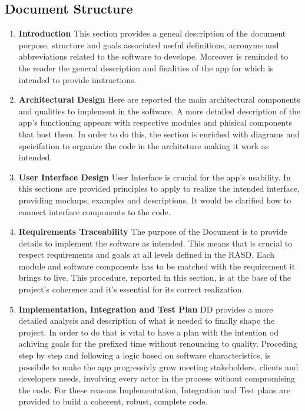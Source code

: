 \subsection{Document Structure}
\begin{enumerate}
    \item \textbf{Introduction} This section provides a geneal description of the document porpose, structure and goals associated useful definitions, acronyms and abbreviations related to the software to develope. Moreover is reminded to the reader the general description and finalities of the app for which is intended to provide instructions.
    \item \textbf{Architectural Design} Here are reported the main architectural components and qualities to implement in the software. A more detailed description of the app's functioning appears with respective modules and phisical components that host them. In order to do this, the section is enriched with diagrams and speicifation to organize the code in the architeture making it work as intended.
    \item \textbf{User Interface Design} User Interface is crucial for the app's usability. In this sections are provided principles to apply to realize the intended interface, providing mockups, examples and descriptions. It would be clarified how to connect interface components to the code.
    \item \textbf{Requirements Traceability} The purpose of the Document is to provide details to implement the software as intended. This means that is crucial to respect requirements and goals at all levels defined in the RASD. Each module and software components has to be matched with the requirement it brings to live. This procedure, reported in this section, is at the base of the project's coherence and it's essential for its  correct realization.
    \item \textbf{Implementation, Integration and Test Plan} DD provides a more detailed analysis and description of what is needed to finally shape the project. In order to do that is vital to have a plan with the intention od achiving goals for the prefixed time without renouncing to quality. Proceding step by step and following a logic based on software characteristics, is possibile to make the app progressivly grow meeting stakeholders, clients and developers needs, involving every actor in the process without compromising the code. For these reasons Implementation, Integration and Test plans are provided to build a coherent, robust, complete code.
\end{enumerate}
